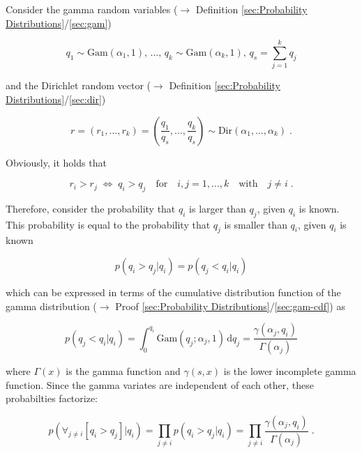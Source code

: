 \documentclass[a4paper,12pt,twoside]{book}
\begin{document}
Consider the gamma random variables ($\rightarrow$ Definition \ref{sec:Probability Distributions}/\ref{sec:gam})

\begin{equation} \label{eq:dir-ep-Gam-Dir-A}
q_1 \sim \mathrm{Gam}(\alpha_1,1), \, \ldots, \, q_k \sim \mathrm{Gam}(\alpha_k,1), \, q_s = \sum_{j=1}^k q_j
\end{equation}

and the Dirichlet random vector ($\rightarrow$ Definition \ref{sec:Probability Distributions}/\ref{sec:dir})

\begin{equation} \label{eq:dir-ep-Gam-Dir-B}
r = (r_1, \ldots, r_k) = \left( \frac{q_1}{q_s}, \ldots, \frac{q_k}{q_s} \right) \sim \mathrm{Dir}(\alpha_1, \ldots, \alpha_k) \; .
\end{equation}

Obviously, it holds that

\begin{equation} \label{eq:dir-ep-Gam-Dir-eq}
r_i > r_j \; \Leftrightarrow \; q_i > q_j \quad \text{for} \quad i,j = 1, \ldots, k \quad \text{with} \quad j \neq i \; .
\end{equation}

Therefore, consider the probability that $q_i$ is larger than $q_j$, given $q_i$ is known. This probability is equal to the probability that $q_j$ is smaller than $q_i$, given $q_i$ is known

\begin{equation} \label{eq:dir-ep-Gam-EP0}
p(q_i > q_j|q_i) = p(q_j < q_i|q_i)
\end{equation}

which can be expressed in terms of the cumulative distribution function of the gamma distribution ($\rightarrow$ Proof \ref{sec:Probability Distributions}/\ref{sec:gam-cdf}) as

\begin{equation} \label{eq:dir-ep-Gam-EP1}
p(q_j < q_i|q_i) = \int_0^{q_i} \mathrm{Gam}(q_j;\alpha_j,1) \, \mathrm{d}q_j = \frac{\gamma(\alpha_j,q_i)}{\Gamma(\alpha_j)}
\end{equation}

where $\Gamma(x)$ is the gamma function and $\gamma(s,x)$ is the lower incomplete gamma function. Since the gamma variates are independent of each other, these probabilties factorize:

\begin{equation} \label{eq:dir-ep-Gam-EP2}
p(\forall_{j \neq i} \left[ q_i > q_j \right]|q_i) = \prod_{j \neq i} p(q_i > q_j|q_i) = \prod_{j \neq i} \frac{\gamma(\alpha_j,q_i)}{\Gamma(\alpha_j)} \; .
\end{equation}
\end{document}
